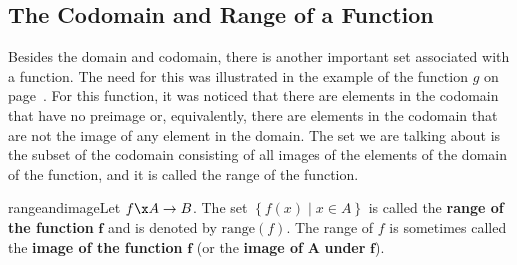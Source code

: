 \subsection*{The Codomain and Range of a Function}
Besides the domain and codomain, there is another important set associated with a function.  The need for this was illustrated in the example of the function $g$ on page~\pageref{example:function}.  For this function, it was noticed that there are elements in the codomain that have no preimage or, equivalently, there are elements in the codomain that are not the image of any element in the domain.  The set we are talking about is the subset of the codomain consisting of all images of the elements of the domain of the function, and it is called the range of the function.
%
\begin{defbox}{rangeandimage}{Let  $f\x A \to B$.  The set  
$\left\{ {f( x ) \mid x \in A} \right\}$  is called the \textbf{range of the function}
%
%
  $\boldsymbol{f}$  and is denoted by  $\text{range}\left( f \right)$\!. \label{sym:rangef}  The range of  $f$  is sometimes called the \textbf{image of the function}  $\boldsymbol{f}$ (or the \textbf{image of} 
$\boldsymbol{A}$ \textbf{under} $\boldsymbol{f}$).}
\end{defbox}

